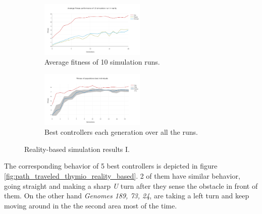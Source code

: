 \begin{figure}[H]
    \centering
    \begin{subfigure}[b]{0.8\textwidth}
    	\centering
        \includegraphics[width=5cm]{include/images/real_avg_fitness.PNG}
        \caption{Average fitness of 10 simulation runs.}
        \label{fig:real_avg_fitness}
    \end{subfigure}
    \begin{subfigure}[b]{0.8\textwidth}
    	\centering
        \includegraphics[width=5cm]{include/images/real_best_genomes_percentile.PNG}
        \caption{Best controllers each generation over all the runs.}
        \label{fig:real_best_genomes_percentile}
    \end{subfigure}
    \caption{Reality-based simulation results I.}
	\label{fig:real_based_resultsI}
\end{figure}

The corresponding behavior of 5 best controllers is depicted in figure \ref{fig:path_traveled_thymio_reality_based}. 2 of them have similar behavior, going straight and making a sharp \emph{U} turn after they sense the obstacle in front of them. On the other hand \emph{Genomes 189, 73, 24}, are taking a left turn and keep moving around in the the second area most of the time.


